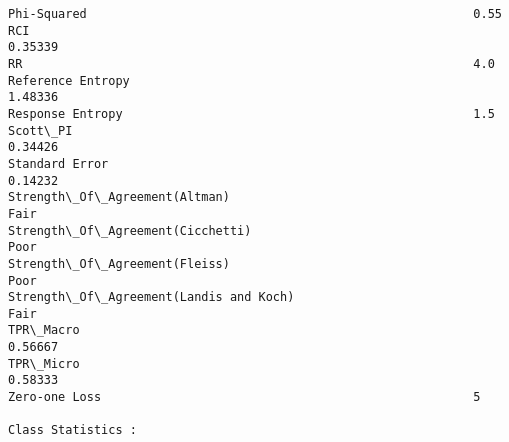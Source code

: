 \documentclass[11pt]{article}
\begin{document}
\begin{Verbatim}[commandchars=\\\{\}]
Phi-Squared                                                      0.55
RCI                                                              0.35339
RR                                                               4.0
Reference Entropy                                                1.48336
Response Entropy                                                 1.5
Scott\_PI                                                         0.34426
Standard Error                                                   0.14232
Strength\_Of\_Agreement(Altman)                                    Fair
Strength\_Of\_Agreement(Cicchetti)                                 Poor
Strength\_Of\_Agreement(Fleiss)                                    Poor
Strength\_Of\_Agreement(Landis and Koch)                           Fair
TPR\_Macro                                                        0.56667
TPR\_Micro                                                        0.58333
Zero-one Loss                                                    5

Class Statistics :


\end{Verbatim}
\end{document}
